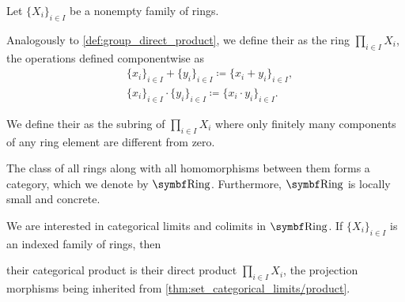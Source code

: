 \begin{definition}\label{def:ring_direct_product}
  Let \( \{ X_i \}_{i \in I} \) be a nonempty family of rings.

  Analogously to \cref{def:group_direct_product}, we define their  as the ring \( \prod_{i \in I} X_i \), the operations defined componentwise as
  \begin{align*}
    &\{ x_i \}_{i \in I} + \{ y_i \}_{i \in I}
    \coloneqq
    \{ x_i + y_i \}_{i \in I}, \\
    &\{ x_i \}_{i \in I} \cdot \{ y_i \}_{i \in I}
    \coloneqq
    \{ x_i \cdot y_i \}_{i \in I}.
  \end{align*}

  We define their  as the subring of \( \prod_{i \in I} X_i \) where only finitely many components of any ring element are different from zero.
\end{definition}

\begin{definition}\label{def:category_of_rings}
  The class of all rings along with all homomorphisms between them forms a category, which we denote by \( \Bold{Ring} \). Furthermore, \( \Bold{Ring} \) is locally small and concrete.
\end{definition}

\begin{proposition}\label{thm:ring_categorical_limits}
  We are interested in categorical limits and colimits in \( \Bold{Ring} \). If \( \{ X_i \}_{i \in I} \) is an indexed family of rings, then
  \begin{defenum}
     their categorical product is their direct product \( \prod_{i \in I} X_i \), the projection morphisms being inherited from \cref{thm:set_categorical_limits/product}.
  \end{defenum}
\end{proposition}

